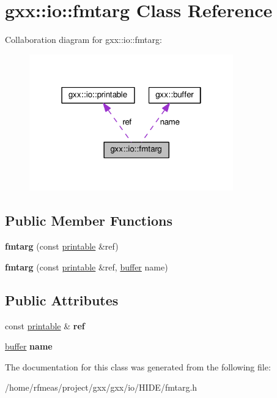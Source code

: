 \hypertarget{classgxx_1_1io_1_1fmtarg}{}\section{gxx\+:\+:io\+:\+:fmtarg Class Reference}
\label{classgxx_1_1io_1_1fmtarg}


Collaboration diagram for gxx\+:\+:io\+:\+:fmtarg\+:
\nopagebreak
\begin{figure}[H]
\begin{center}
\leavevmode
\includegraphics[width=250pt]{classgxx_1_1io_1_1fmtarg__coll__graph}
\end{center}
\end{figure}
\subsection*{Public Member Functions}
\begin{DoxyCompactItemize}
\item 
{\bfseries fmtarg} (const \hyperlink{classgxx_1_1io_1_1printable}{printable} \&ref)\hypertarget{classgxx_1_1io_1_1fmtarg_ad02731d2ea483d313479ab571b49d6f1}{}\label{classgxx_1_1io_1_1fmtarg_ad02731d2ea483d313479ab571b49d6f1}

\item 
{\bfseries fmtarg} (const \hyperlink{classgxx_1_1io_1_1printable}{printable} \&ref, \hyperlink{classgxx_1_1buffer}{buffer} name)\hypertarget{classgxx_1_1io_1_1fmtarg_a2aeebc21ec74be782cf03902a9fabc78}{}\label{classgxx_1_1io_1_1fmtarg_a2aeebc21ec74be782cf03902a9fabc78}

\end{DoxyCompactItemize}
\subsection*{Public Attributes}
\begin{DoxyCompactItemize}
\item 
const \hyperlink{classgxx_1_1io_1_1printable}{printable} \& {\bfseries ref}\hypertarget{classgxx_1_1io_1_1fmtarg_a2a88c9c07f659582f90a83ef64a0ecb3}{}\label{classgxx_1_1io_1_1fmtarg_a2a88c9c07f659582f90a83ef64a0ecb3}

\item 
\hyperlink{classgxx_1_1buffer}{buffer} {\bfseries name}\hypertarget{classgxx_1_1io_1_1fmtarg_a114fcf4825ebca3a95204a0f19d410de}{}\label{classgxx_1_1io_1_1fmtarg_a114fcf4825ebca3a95204a0f19d410de}

\end{DoxyCompactItemize}


The documentation for this class was generated from the following file\+:\begin{DoxyCompactItemize}
\item 
/home/rfmeas/project/gxx/gxx/io/\+H\+I\+D\+E/fmtarg.\+h\end{DoxyCompactItemize}
